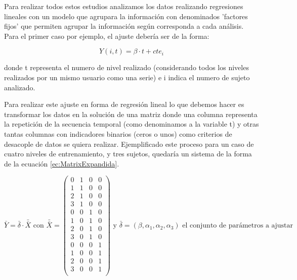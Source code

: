 \documentclass{article}
\begin{document}
    Para realizar todos estos estudios analizamos los datos realizando regresiones lineales con un modelo que agrupara la información con denominados 'factores fijos' que permiten agrupar la información según corresponda a cada análisis. Para el primer caso por ejemplo, el ajuste debería ser de la forma:
    
    \begin{equation} \label{ec:RegresionEntrenamiento1}
        Y(i,t) = \beta \cdot t + cte_i
    \end{equation}
    
    donde t representa el numero de nivel realizado (considerando todos los niveles realizados por un mismo usuario como una serie) e i indica el numero de sujeto analizado.

    Para realizar este ajuste en forma de regresión lineal lo que debemos hacer es transformar los datos en la solución de una matriz donde una columna representa la repetición de la secuencia temporal (como denominamos a la variable t) y otras tantas columnas con indicadores binarios (ceros o unos) como criterios de desacople de datos se quiera realizar. Ejemplificado este proceso para un caso de cuatro niveles de entrenamiento, y tres sujetos, quedaría un sistema de la forma de la ecuación \ref{ec:MatrixExpandida}.

    \begin{equation} \label{ec:MatrixExpandida}
    \bar {Y} = \bar{\delta} \cdot \bar{\bar{X}} \text{ con } \bar{\bar{X}} =
     \begin{pmatrix}
        0 & 1 & 0 & 0\\
        1 & 1 & 0 & 0\\
        2 & 1 & 0 & 0\\
        3 & 1 & 0 & 0\\
        0 & 0 & 1 & 0\\
        1 & 0 & 1 & 0\\
        2 & 0 & 1 & 0\\
        3 & 0 & 1 & 0\\
        0 & 0 & 0 & 1\\
        1 & 0 & 0 & 1\\
        2 & 0 & 0 & 1\\
        3 & 0 & 0 & 1\\
     \end{pmatrix} \text{ y $\bar{\delta}=(\beta,\alpha_1,\alpha_2,\alpha_3)$ el conjunto de parámetros a ajustar}
 \end{equation}
 
\end{document}
